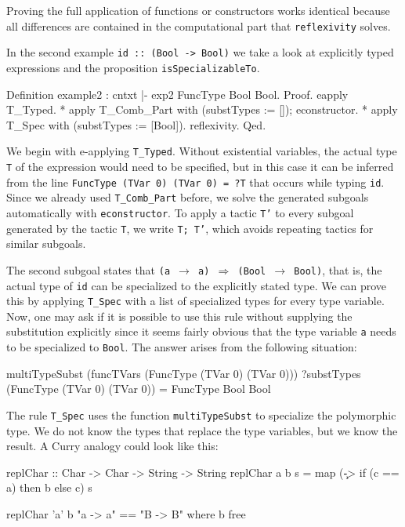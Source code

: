 \documentclass[paper = a4, fleqn, abstract=on, twoside]{scrreprt}
\begin{document}
\par
Proving the full application of functions or constructors works identical because all differences are contained in the computational part that \texttt{reflexivity} solves.\\
\par\noindent
In the second example \texttt{id :: (Bool -> Bool)} we take a look at explicitly typed expressions and the proposition \texttt{isSpecializableTo}. 
\begin{coqcode}
Definition example2 : cntxt |- exp2 \in FuncType Bool Bool.
Proof.
  eapply T_Typed.
    * apply T_Comb_Part with (substTypes := []);
      econstructor.
    * apply T_Spec with (substTypes := [Bool]).
      reflexivity.
Qed.
\end{coqcode}
We begin with e-applying \texttt{T\_Typed}. Without existential variables, the actual type \texttt{T} of the expression would need to be specified, but in this case it can be inferred from the line \texttt{FuncType (TVar 0) (TVar 0) = ?T} that occurs while typing \texttt{id}. Since we already used \texttt{T\_Comb\_Part} before, we solve the generated subgoals automatically with \texttt{econstructor}. To apply a tactic \texttt{T'} to every subgoal generated by the tactic \texttt{T}, we write \texttt{T; T'}, which avoids repeating tactics for similar subgoals. 
\par
The second subgoal states that \texttt{(a $\rightarrow$ a) $\Rightarrow$ (Bool $\rightarrow$ Bool)}, that is, the actual type of \texttt{id} can be specialized to the explicitly stated type. We can prove this by applying \texttt{T\_Spec} with a list of specialized types for every type variable. Now, one may ask if it is possible to use this rule without supplying the substitution explicitly since it seems fairly obvious that the type variable \texttt{a} needs to be specialized to \texttt{Bool}. The answer arises from the following situation:
\begin{coqcode}
multiTypeSubst (funcTVars (FuncType (TVar 0) (TVar 0))) ?substTypes
(FuncType (TVar 0) (TVar 0)) = FuncType Bool Bool
\end{coqcode}
The rule \texttt{T\_Spec} uses the function \texttt{multiTypeSubst} to specialize the polymorphic type. We do not know the types that replace the type variables, but we know the result. A Curry analogy could look like this:
\begin{haskellcode}
replChar :: Char -> Char -> String -> String
replChar a b s = map (\c -> if (c == a) then b else c) s

replChar 'a' b "a -> a" == "B -> B" where b free
\end{haskellcode}
\end{document}
